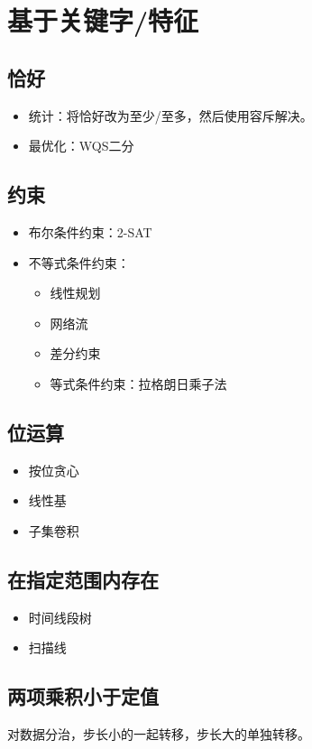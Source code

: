 \section{基于关键字/特征}
\subsection{恰好}
\begin{itemize}
    \item 统计：将恰好改为至少/至多，然后使用容斥解决。
    \item 最优化：WQS二分
\end{itemize}
\subsection{约束}
\begin{itemize}
    \item 布尔条件约束：2-SAT
    \item 不等式条件约束：
    \begin{itemize}
        \item 线性规划
        \item 网络流
        \item 差分约束
    \end{itemize}
    \begin{itemize}
        \item 等式条件约束：拉格朗日乘子法
    \end{itemize}
\end{itemize}
\subsection{位运算}
\begin{itemize}
    \item 按位贪心
    \item 线性基
    \item 子集卷积
\end{itemize}
\subsection{在指定范围内存在}
\begin{itemize}
    \item 时间线段树
    \item 扫描线
\end{itemize}
\subsection{两项乘积小于定值}
对数据分治，步长小的一起转移，步长大的单独转移。
